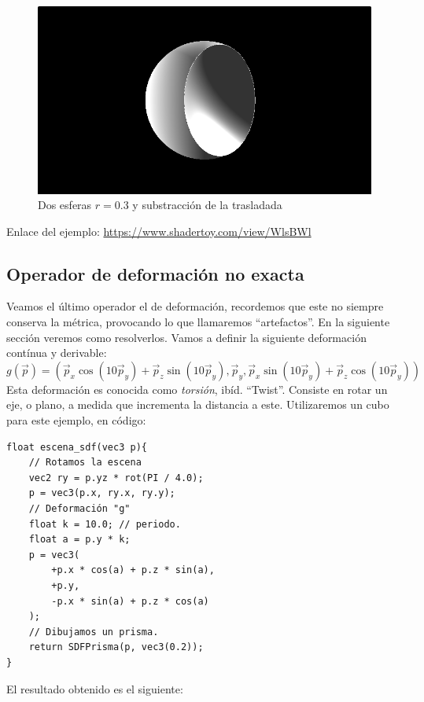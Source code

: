 \begin{figure}[H]
  \centering
  \captionsetup{justification=centering}%
  \includegraphics[width=1.0\textwidth]{secciones/imagenes/sdf/3d/sdf_substract_3d.png}
  \caption{Dos esferas \(r=0.3\) y substracción de la trasladada}
  \label{fig:sub3d}
\end{figure}

Enlace del ejemplo:
\url{https://www.shadertoy.com/view/WlsBWl}

\subsection{Operador de deformación no exacta}
Veamos el último operador el de deformación, recordemos que este no siempre conserva la métrica, provocando lo que llamaremos \enquote{artefactos}. En la siguiente sección veremos como resolverlos. Vamos a definir la siguiente deformación contínua y derivable:
\[g(\Vec{p})=(
\Vec{p}_x \cos(10\Vec{p}_y) + \Vec{p}_z\sin(10\Vec{p}_y),
\Vec{p}_y,
\Vec{p}_x\sin(10\Vec{p}_y) + \Vec{p}_z\cos(10\Vec{p}_y)
)
\]
Esta deformación es conocida como \textit{torsión}, ibíd. \enquote{Twist}. Consiste en rotar un eje, o plano, a medida que incrementa la distancia a este. Utilizaremos un cubo para este ejemplo, en código:

\begin{lstlisting}
float escena_sdf(vec3 p){
    // Rotamos la escena
    vec2 ry = p.yz * rot(PI / 4.0);
    p = vec3(p.x, ry.x, ry.y);
    // Deformación "g"
    float k = 10.0; // periodo.
    float a = p.y * k;
    p = vec3(
    	+p.x * cos(a) + p.z * sin(a),
    	+p.y,
        -p.x * sin(a) + p.z * cos(a)
    );
	// Dibujamos un prisma.
    return SDFPrisma(p, vec3(0.2));
}
\end{lstlisting}

El resultado obtenido es el siguiente:

